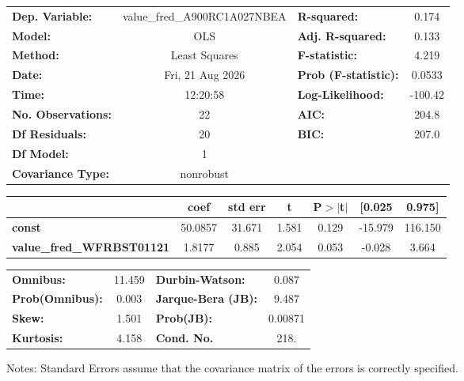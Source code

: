 \begin{center}
\begin{tabular}{lclc}
\toprule
\textbf{Dep. Variable:}           & value\_fred\_A900RC1A027NBEA & \textbf{  R-squared:         } &     0.174   \\
\textbf{Model:}                   &             OLS              & \textbf{  Adj. R-squared:    } &     0.133   \\
\textbf{Method:}                  &        Least Squares         & \textbf{  F-statistic:       } &     4.219   \\
\textbf{Date:}                    &       Fri, 21 Aug 2026       & \textbf{  Prob (F-statistic):} &   0.0533    \\
\textbf{Time:}                    &           12:20:58           & \textbf{  Log-Likelihood:    } &   -100.42   \\
\textbf{No. Observations:}        &                22            & \textbf{  AIC:               } &     204.8   \\
\textbf{Df Residuals:}            &                20            & \textbf{  BIC:               } &     207.0   \\
\textbf{Df Model:}                &                 1            & \textbf{                     } &             \\
\textbf{Covariance Type:}         &          nonrobust           & \textbf{                     } &             \\
\bottomrule
\end{tabular}
\begin{tabular}{lcccccc}
                                  & \textbf{coef} & \textbf{std err} & \textbf{t} & \textbf{P$> |$t$|$} & \textbf{[0.025} & \textbf{0.975]}  \\
\midrule
\textbf{const}                    &      50.0857  &       31.671     &     1.581  &         0.129        &      -15.979    &      116.150     \\
\textbf{value\_fred\_WFRBST01121} &       1.8177  &        0.885     &     2.054  &         0.053        &       -0.028    &        3.664     \\
\bottomrule
\end{tabular}
\begin{tabular}{lclc}
\textbf{Omnibus:}       & 11.459 & \textbf{  Durbin-Watson:     } &    0.087  \\
\textbf{Prob(Omnibus):} &  0.003 & \textbf{  Jarque-Bera (JB):  } &    9.487  \\
\textbf{Skew:}          &  1.501 & \textbf{  Prob(JB):          } &  0.00871  \\
\textbf{Kurtosis:}      &  4.158 & \textbf{  Cond. No.          } &     218.  \\
\bottomrule
\end{tabular}
\end{center}

Notes: \newline
 [1] Standard Errors assume that the covariance matrix of the errors is correctly specified.